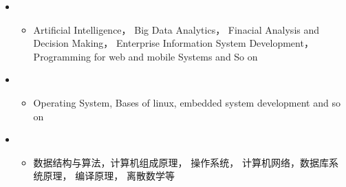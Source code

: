   \begin{itemize}[leftmargin=*]
    \item
      {\small
      \begin{itemize}
        \item{Artificial Intelligence， Big Data Analytics， Finacial Analysis and Decision Making， Enterprise Information System Development， Programming for web and mobile Systems and So on}
      \end{itemize}
      }
    
    \item
    {\small
    \begin{itemize}
      \item{Operating System, Bases of linux, embedded system development and so on}
    \end{itemize}
    }
   \item  
      {\small
      \begin{itemize}
        \item{数据结构与算法，计算机组成原理， 操作系统， 计算机网络，数据库系统原理， 编译原理， 离散数学等}
      \end{itemize}
      }
  \end{itemize}